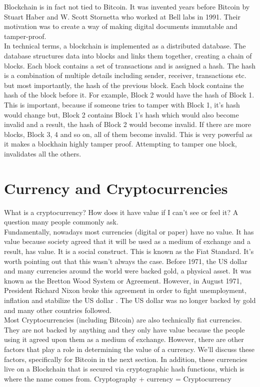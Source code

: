 \documentclass[11pt]{article} %
\begin{document}
\noindent Blockchain is in fact not tied to Bitcoin. It was invented years before Bitcoin by Stuart Haber and W. Scott Stornetta who worked at Bell labs in 1991. Their motivation was to create a way of making digital documents immutable and tamper-proof. \\

\noindent In technical terms, a blockchain is implemented as a distributed database. The database structures data into blocks and links them together, creating a chain of blocks. Each block contains a set of transactions and is assigned a hash. The hash is a combination of multiple details including sender, receiver, transactions etc.  but most importantly, the hash of the previous block. Each block contains the hash of the block before it. For example, Block 2 would have the hash of Block 1. This is important, because if someone tries to tamper with Block 1, it's hash would change but, Block 2 contains Block 1's hash which would also become invalid and a result, the hash of Block 2 would become invalid. If there are more blocks, Block 3, 4 and so on, all of them become invalid. This is very powerful as it makes a blockhain highly tamper proof. Attempting to tamper one block, invalidates all the others. \\

\section{Currency and Cryptocurrencies}{}
What is a cryptocurrency? How does it have value if I can't see or feel it? A question many people commonly ask.\\


\noindent Fundamentally, nowadays most currencies (digital or paper) have no value. It has value because society agreed that it will be used as a medium of exchange and a result, has value. It is a social construct. This is known as the Fiat Standard. It's worth pointing out that this wasn't always the case. Before 1971, the US dollar and many currencies around the world were backed gold, a physical asset. It was known as the Bretton Wood System or Agreement. However, in August 1971, President Richard Nixon broke this agreement in order to fight unemployment, inflation and stabilize the US dollar \cite{17}. The US dollar was no longer backed by gold and many other countries followed.\\


\noindent Most Cryptocurrencies (including Bitcoin) are also technically fiat currencies. They are not backed by anything and they only have value because the people using it agreed upon them as a medium of exchange. However, there are other factors that play a role in determining the value of a currency. We'll discuss these factors, specifically for Bitcoin in the next section. In addition, these currencies live on a Blockchain that is secured via cryptographic hash functions, which is where the name comes from. Cryptography + currency = Cryptocurrency\\
\end{document}
